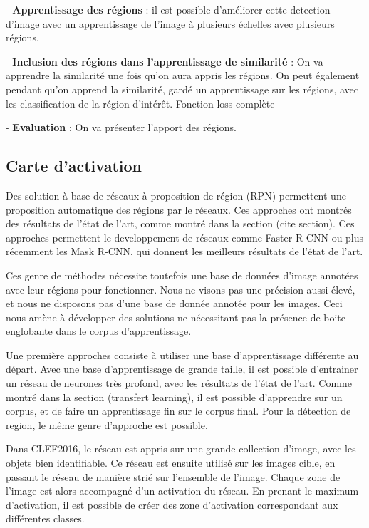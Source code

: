  - \textbf{Apprentissage des régions} : il est possible d'améliorer cette detection d'image avec un apprentissage de l'image à plusieurs échelles avec plusieurs régions.
 
 - \textbf{Inclusion des régions dans l'apprentissage de similarité} : On va apprendre la similarité une fois qu'on aura appris les régions. On peut également pendant qu'on apprend la similarité, gardé un apprentissage sur les régions, avec les classification de la région d'intérêt. Fonction loss complète
 
 - \textbf{Evaluation} : On va présenter l'apport des régions.

\subsection{Carte d'activation}


Des solution à base de réseaux à proposition de région (RPN) permettent une proposition automatique des régions par le réseaux. Ces approches ont montrés des résultats de l'état de l'art, comme montré dans la section (cite section). Ces approches permettent le developpement de réseaux comme Faster R-CNN ou plus récemment les Mask R-CNN, qui donnent les meilleurs résultats de l'état de l'art.

Ces genre de méthodes nécessite toutefois une base de données d'image annotées avec leur régions pour fonctionner. Nous ne visons pas une précision aussi élevé, et nous ne disposons pas d'une base de donnée annotée pour les images. Ceci nous amène à développer des solutions ne nécessitant pas la présence de boite englobante dans le corpus d'apprentissage.

Une première approches consiste à utiliser une base d'apprentissage différente au départ. Avec une base d'apprentissage de grande taille, il est possible d'entrainer un réseau de neurones très profond, avec les résultats de l'état de l'art. Comme montré dans la section (transfert learning), il est possible d'apprendre sur un corpus, et de faire un apprentissage fin sur le corpus final. Pour la détection de region, le même genre d'approche est possible. 

Dans CLEF2016, le réseau est appris sur une grande collection d'image, avec les objets bien identifiable. Ce réseau est ensuite utilisé sur les images cible, en passant le réseau de manière strié sur l'ensemble de l'image. Chaque zone de l'image est alors accompagné d'un activation du réseau. En prenant le maximum d'activation, il est possible de créer des zone d'activation correspondant aux différentes classes.

